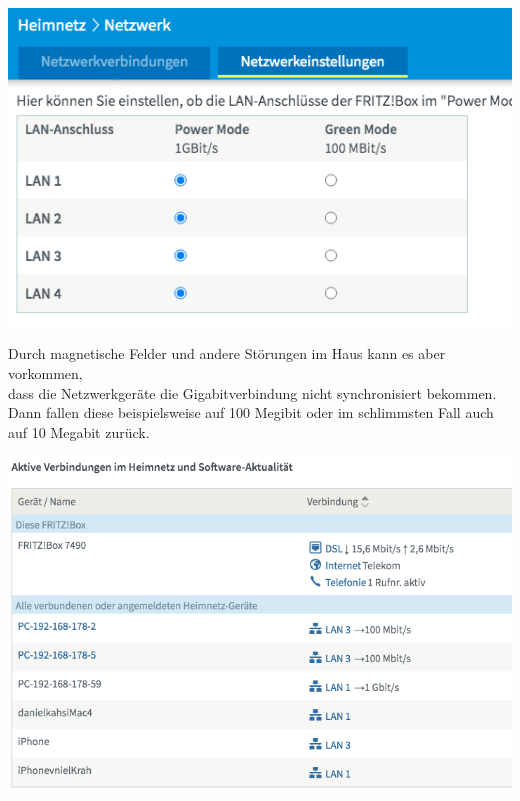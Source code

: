 {\vspace{0.2cm}}
\begin{center}
  \includegraphics[scale=0.40]{./pictures/powerSaveNetwork.png}
\end{center}

Durch magnetische Felder und andere Störungen im Haus kann es aber vorkommen, \\
dass die Netzwerkgeräte die Gigabitverbindung nicht synchronisiert bekommen.
Dann fallen diese beispielsweise auf 100 Megibit oder im schlimmsten Fall auch auf 10 Megabit zurück.
\begin{center}
  \includegraphics[scale=0.40]{./pictures/aktuelleNetzwerkGeraete.png}
\end{center}

